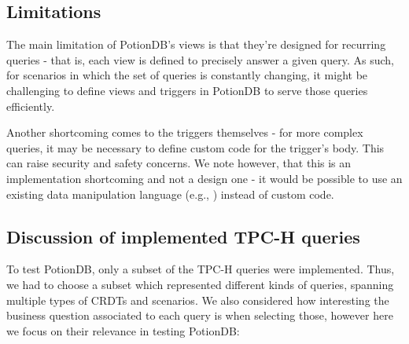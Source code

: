 \documentclass{vldb}
\newcommand{\grumbler}[2]{{\color{red}{\bf #1:} #2}}
\renewcommand{\grumbler}[2]{}
\newcommand{\andre}[1]{\grumbler{andre}{#1}}
\begin{document}
\andre{Does this needs some concluding note?}




\subsection{Limitations}

The main limitation of PotionDB's views is that they're designed for recurring queries - that is, each view is defined to precisely answer a given query.
As such, for scenarios in which the set of queries is constantly changing, it might be challenging to define views and triggers in PotionDB to serve those queries efficiently.

Another shortcoming comes to the triggers themselves - for more complex queries, it may be necessary to define custom code for the trigger's body.
This can raise security and safety concerns.
We note however, that this is an implementation shortcoming and not a design one - it would be possible to use an existing data manipulation language (e.g., \cite{oracleTriggers}) instead of custom code.

\andre{Any suggestions for further limitations?}


\subsection{Discussion of implemented TPC-H queries}
\label{subsec:implementedQueries}

\andre{Note: This should be somewhere else (maybe its own section? Suggestions?), but for now I'll leave it here}
\andre{TODO: Explain/mention TopSum in relevant sections}

To test PotionDB, only a subset of the TPC-H queries were implemented.
Thus, we had to choose a subset which represented different kinds of queries, spanning multiple types of CRDTs and scenarios.
We also considered how interesting the business question associated to each query is when selecting those, however here we focus on their relevance in testing PotionDB:
\end{document}
